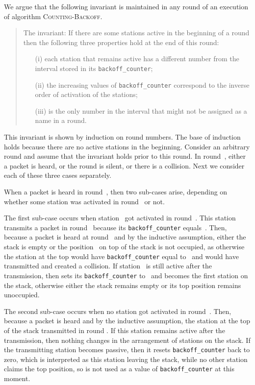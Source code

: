 \documentclass[11pt]{article}
\newcommand{\qed}{\hfill  \smallbreak}
\newenvironment{proof}{\noindent{\bf Proof:}}{\qed}
\begin{document}
\begin{proof} 
We argue that the following invariant is maintained in any round of an execution of algorithm \textsc{Counting-Backoff}.
\begin{quote}
\textsf{The invariant:}
If there are some  stations active in the beginning of a round then the following three properties hold at the end of this round:
\begin{enumerate}
\item[(i)] 
each station that remains active has a different number from the interval  stored in its \texttt{backoff\_counter};

\item[(ii)]
the increasing values of  \texttt{backoff\_counter} correspond to the inverse order of  activation of the stations;

\item[(iii)] 
 is the only number in the interval  that might not be assigned as a name in a round.
\end{enumerate}
\end{quote}
This invariant is shown by induction  on  round numbers.
The base of induction holds because there are no active stations in the beginning.
Consider an arbitrary round  and assume that the invariant holds prior to this round.
In round~,  either a packet is heard, or the round is silent, or there is a collision. 
Next we consider each of these three cases separately. 

When a packet is heard in round~, then two sub-cases arise, depending on whether some station was activated in round~ or not.

The first sub-case occurs when station~ got activated in round~.
This station transmits a packet in round~ because its \texttt{backoff\_counter} equals~.
Then, because a packet is heard at round~ and by the inductive assumption, either the stack is empty or the position~ on top of the stack is not occupied, as otherwise the station at the top  would have \texttt{backoff\_counter} equal to~ and would have transmitted and created a collision.
If station~ is still active after the transmission, then  sets its \texttt{backoff\_counter} to~ and becomes the first station on the stack, otherwise either the stack remains empty or its top position remains unoccupied.

The second sub-case occurs when no station got activated in round~.
Then, because a packet is heard and by the inductive assumption, the station at the top of the stack transmitted in round .
If this station remains active after the transmission, then nothing changes in the arrangement of stations on the stack.
If the transmitting station becomes passive, then it resets \texttt{backoff\_counter} back to zero, which is interpreted as this station leaving the stack, while no other station claims the top position,  so  is not used as a value of \texttt{backoff\_counter} at this moment.


\end{proof}
\end{document}
